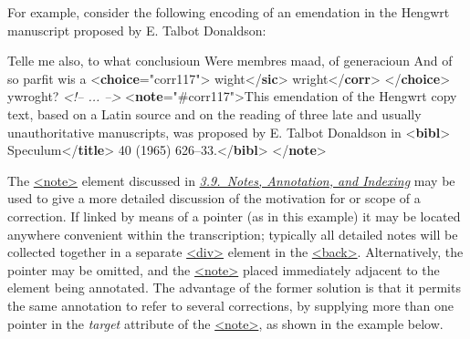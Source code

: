 For example, consider the following encoding of an emendation in the Hengwrt manuscript proposed by E. Talbot Donaldson: \par\bgroup{}\exampleFont \begin{shaded}\noindent\mbox{}Telle me also, to what conclusioun Were\mbox{}\newline 
 membres maad, of generacioun And of so parfit wis a {<\textbf{choice}\hspace*{1em}{xml:id}="{corr117}">}\mbox{}\newline 
{}wight{</\textbf{sic}>}\mbox{}\newline 
{}wright{</\textbf{corr}>}\mbox{}\newline 
{</\textbf{choice}>} ywroght? \mbox{}\newline 
\textit{<!-- ... -->}\mbox{}\newline 
{<\textbf{note}\hspace*{1em}{target}="{\#corr117}">}This emendation of the Hengwrt copy text, based on a Latin\mbox{}\newline 
 source and on the reading of three late and usually unauthoritative\mbox{}\newline 
 manuscripts, was proposed by E. Talbot Donaldson in\mbox{}\newline 
{<\textbf{bibl}>}\mbox{}\newline 
\hspace*{1em}Speculum{</\textbf{title}>} 40 (1965) 626–33.{</\textbf{bibl}>}\mbox{}\newline 
{</\textbf{note}>}\end{shaded}\egroup\par \noindent  The \hyperref[TEI.note]{<note>} element discussed in \textit{\hyperref[CONO]{3.9.\ Notes, Annotation, and Indexing}} may be used to give a more detailed discussion of the motivation for or scope of a correction. If linked by means of a pointer (as in this example) it may be located anywhere convenient within the transcription; typically all detailed notes will be collected together in a separate \hyperref[TEI.div]{<div>} element in the \hyperref[TEI.back]{<back>}. Alternatively, the pointer may be omitted, and the \hyperref[TEI.note]{<note>} placed immediately adjacent to the element being annotated. The advantage of the former solution is that it permits the same annotation to refer to several corrections, by supplying more than one pointer in the {\itshape target} attribute of the \hyperref[TEI.note]{<note>}, as shown in the example below.\par
